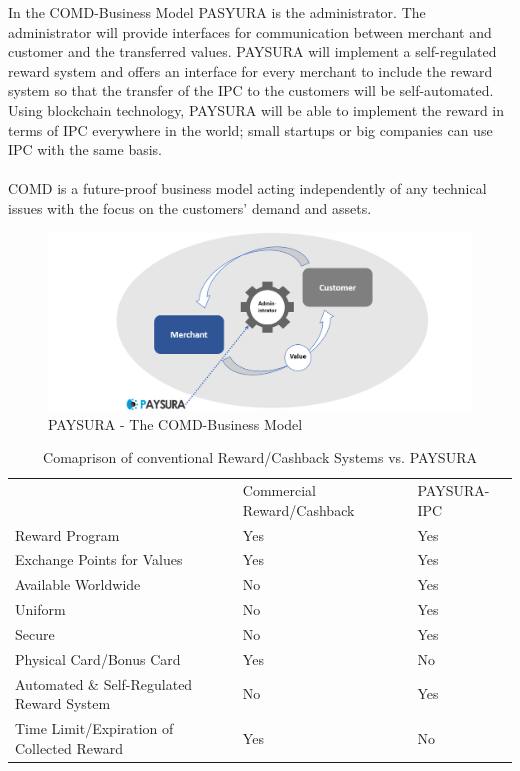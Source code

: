 \documentclass[twoside,onecolumn]{article}
\begin{document}
In the COMD-Business Model PASYURA is the administrator. The administrator will provide interfaces for communication between merchant and customer and the transferred values. PAYSURA will implement a self-regulated reward system and offers an interface for every merchant to include the reward system so that the transfer of the IPC to the customers will be self-automated. Using blockchain technology, PAYSURA will be able to implement the reward in terms of IPC everywhere in the world; small startups or big companies can use IPC with the same basis. \\
\\
COMD is a future-proof business model acting independently of any technical issues with the focus on the customers' demand and assets. 

\begin{figure}[ht]
\centering
\includegraphics[scale=0.34]{COSD_modell23.png}
\caption{PAYSURA - The COMD-Business Model}
\label{pool}
\end{figure}

\begin{table}[ht]
\centering
\label{my-label}
\begin{tabular}{lll}
                                           & Commercial Reward/Cashback & PAYSURA-IPC \\
Reward Program                             & Yes                         & Yes         \\
Exchange Points for Values                 & Yes                         & Yes         \\
Available Worldwide                        & No                         & Yes         \\
Uniform                                    & No                          & Yes         \\
Secure                                     & No                          & Yes         \\
Physical Card/Bonus Card                   & Yes                         & No         \\
Automated \& Self-Regulated Reward System & No                          & Yes         \\
Time Limit/Expiration of Collected Reward & Yes                         & No         
\end{tabular}
\caption{Comaprison of conventional Reward/Cashback Systems vs. PAYSURA}
\end{table}
\newpage
\end{document}
